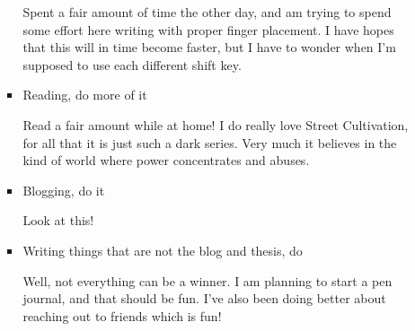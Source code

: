 \documentclass[12pt]{article}
\renewcommand{\,}{\textsuperscript{,}}
\begin{document}
\begin{itemize}
\begin{itemize}
\begin{itemize}
Spent a fair amount of time the other day, and am trying to spend some effort here writing with proper finger placement. I have hopes that this will in time become faster, but I have to wonder when I'm supposed to use each different shift key.

\item Reading, do more of it

Read a fair amount while at home!  
I do really love Street Cultivation, for all that it is just such a dark series.  
Very much it believes in the kind of world where power concentrates and abuses.

\item Blogging, do it

Look at this!

\item Writing things that are not the blog and thesis, do

Well, not everything can be a winner. I am planning to start a pen journal, and that should be fun.  
I've also been doing better about reaching out to friends which is fun!

\end{itemize}

\end{itemize}

\end{itemize}
\end{document}
